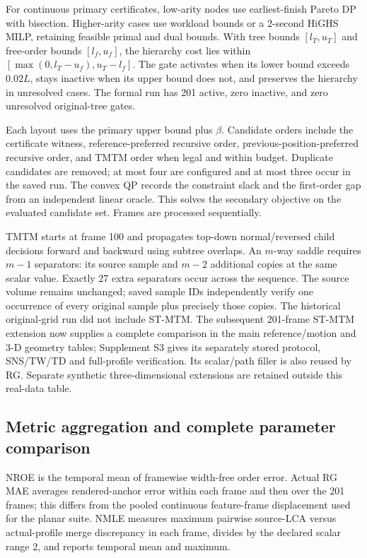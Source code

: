 For continuous primary certificates, low-arity nodes use earliest-finish Pareto DP with bisection. Higher-arity cases use workload bounds or a 2-second HiGHS MILP, retaining feasible primal and dual bounds. With tree bounds $[l_T,u_T]$ and free-order bounds $[l_f,u_f]$, the hierarchy cost lies within $[\max(0,l_T-u_f),u_T-l_f]$. The gate activates when its lower bound exceeds $0.02L$, stays inactive when its upper bound does not, and preserves the hierarchy in unresolved cases. The formal run has 201 active, zero inactive, and zero unresolved original-tree gates.

Each layout uses the primary upper bound plus $\beta$. Candidate orders include the certificate witness, reference-preferred recursive order, previous-position-preferred recursive order, and TMTM order when legal and within budget. Duplicate candidates are removed; at most four are configured and at most three occur in the saved run. The convex QP records the constraint slack and the first-order gap from an independent linear oracle. This solves the secondary objective on the evaluated candidate set. Frames are processed sequentially.

TMTM starts at frame 100 and propagates top-down normal/reversed child decisions forward and backward using subtree overlaps. An $m$-way saddle requires $m-1$ separators: its source sample and $m-2$ additional copies at the same scalar value. Exactly 27 extra separators occur across the sequence. The source volume remains unchanged; saved sample IDs independently verify one occurrence of every original sample plus precisely those copies. The historical original-grid run did not include ST-MTM. The subsequent 201-frame ST-MTM extension now supplies a complete comparison in the main reference/motion and 3-D geometry tables; Supplement S3 gives its separately stored protocol, SNS/TW/TD and full-profile verification. Its scalar/path filler is also reused by RG. Separate synthetic three-dimensional extensions are retained outside this real-data table.

\subsection{Metric aggregation and complete parameter comparison}
NROE is the temporal mean of framewise width-free order error. Actual RG MAE averages rendered-anchor error within each frame and then over the 201 frames; this differs from the pooled continuous feature-frame displacement used for the planar suite. NMLE measures maximum pairwise source-LCA versus actual-profile merge discrepancy in each frame, divides by the declared scalar range 2, and reports temporal mean and maximum.

